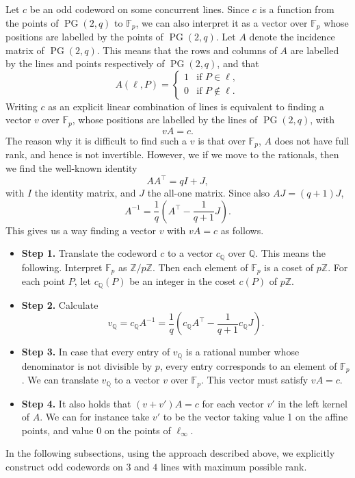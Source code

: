 \documentclass[12pt, a4paper]{article}
\theoremstyle{definition}
\newcommand{\FF}{\mathbb F}
\newcommand{\QQ}{\mathbb Q}
\newcommand{\ZZ}{\mathbb Z}
\DeclareMathOperator{\PG}{PG}
\newcommand{\pg}{\PG}
\begin{document}
Let $c$ be an odd codeword on some concurrent lines.
Since $c$ is a function from the points of $\pg(2,q)$ to $\FF_p$, we can also interpret it as a vector over $\FF_p$ whose positions are labelled by the points of $\pg(2,q)$.
Let $A$ denote the incidence matrix of $\pg(2,q)$.
This means that the rows and columns of $A$ are labelled by the lines and points respectively of $\pg(2,q)$, and that
\[
 A(\ell,P) = \begin{cases}
  1 & \text{if } P \in \ell, \\
  0 & \text{if } P \notin \ell.
 \end{cases}
\]
Writing $c$ as an explicit linear combination of lines is equivalent to finding a vector $v$ over $\FF_p$, whose positions are labelled by the lines of $\pg(2,q)$, with
\[
 v A = c.
\]
The reason why it is difficult to find such a $v$ is that over $\FF_p$, $A$ does not have full rank, and hence is not invertible.
However, we if we move to the rationals, then we find the well-known identity
\[
 A A^\top = q I + J,
\]
with $I$ the identity matrix, and $J$ the all-one matrix.
Since also $AJ = (q+1)J$,
\[
 A^{-1} = \frac1q\left( A^\top - \frac1 {q+1} J \right).
\]
This gives us a way finding a vector $v$ with $vA = c$ as follows.
\begin{itemize}
 \item[] {\bf Step 1.} Translate the codeword $c$ to a vector $c_\QQ$ over $\QQ$.
 This means the following.
 Interpret $\FF_p$ as $\ZZ / p \ZZ$.
 Then each element of $\FF_p$ is a coset of $p \ZZ$.
 For each point $P$, let $c_\QQ(P)$ be an integer in the coset $c(P)$ of $p \ZZ$.
 \item[] {\bf Step 2.} Calculate 
 \[
  v_\QQ = c_\QQ A^{-1} = \frac1q\left( c_\QQ A^\top - \frac1 {q+1} c_\QQ J \right).
 \]
 \item[] {\bf Step 3.} In case that every entry of $v_\QQ$ is a rational number whose denominator is not divisible by $p$, every entry corresponds to an element of $\FF_p$.
 We can translate $v_\QQ$ to a vector $v$ over $\FF_p$.
 This vector must satisfy $v A = c$.
 \item[] {\bf Step 4.} It also holds that $(v+v')A = c$ for each vector $v'$ in the left kernel of $A$.
 We can for instance take $v'$ to be the vector taking value 1 on the affine points, and value 0 on the points of $\ell_\infty$.
\end{itemize}

In the following subsections, using the approach described above, we explicitly construct odd codewords on $3$ and $4$ lines with maximum possible rank.
\end{document}
